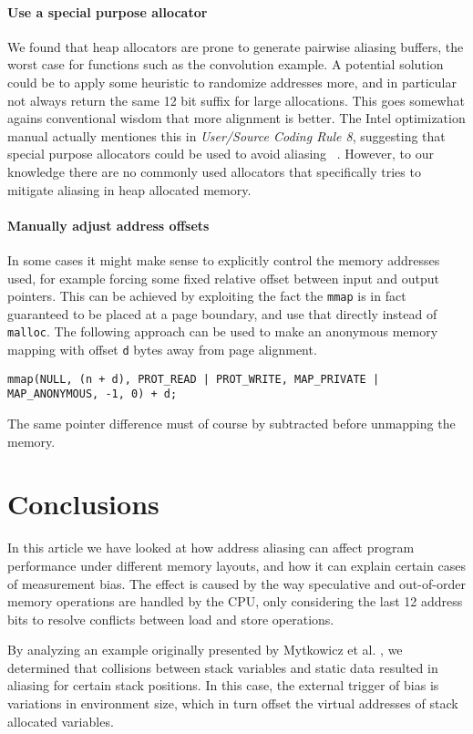 \documentclass[prodmode,acmtaco]{acmsmall}
\begin{document}
{\paragraph{Use a special purpose allocator}
We found that heap allocators are prone to generate pairwise aliasing buffers, the worst case for functions such as the convolution example.
A potential solution could be to apply some heuristic to randomize addresses more, and in particular not always return the same 12 bit suffix for large allocations.
This goes somewhat agains conventional wisdom that more alignment is better.
The Intel optimization manual actually mentiones this in \emph{User/Source Coding Rule 8}, suggesting that special purpose allocators could be used to avoid aliasing ~\cite{OptimizationManual}.
However, to our knowledge there are no commonly used allocators that specifically tries to mitigate aliasing in heap allocated memory.

\paragraph{Manually adjust address offsets}
In some cases it might make sense to explicitly control the memory addresses used, for example forcing some fixed relative offset between input and output pointers.
This can be achieved by exploiting the fact the \texttt{mmap} is in fact guaranteed to be placed at a page boundary, and use that directly instead of \texttt{malloc}.
The following approach can be used to make an anonymous memory mapping with offset \texttt{d} bytes away from page alignment.
\begin{lstlisting}[breaklines=true]
    mmap(NULL, (n + d), PROT_READ | PROT_WRITE, MAP_PRIVATE | MAP_ANONYMOUS, -1, 0) + d;
\end{lstlisting}
The same pointer difference must of course by subtracted before unmapping the memory.


\section{Conclusions}
\label{sec:conclusions}
In this article we have looked at how address aliasing can affect program performance under different memory layouts, and how it can explain certain cases of measurement bias. 
The effect is caused by the way speculative and out-of-order memory operations are handled by the CPU, only considering the last 12 address bits to resolve conflicts between load and store operations.

By analyzing an example originally presented by Mytkowicz et al. \cite{Mytkowicz:2009:WrongData}, we determined that collisions between stack variables and static data resulted in aliasing for certain stack positions.
In this case, the external trigger of bias is variations in environment size, which in turn offset the virtual addresses of stack allocated variables.

}
\end{document}
